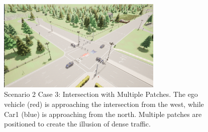 \begin{figure}[H]
    \centering
    \includegraphics[width=0.7\textwidth]{figures/experiments/scenario2_v3.png}
    \caption{Scenario 2 Case 3: Intersection with Multiple Patches. The ego vehicle (red) is approaching the intersection from the west, while Car1 (blue) is approaching from the north. Multiple patches are positioned to create the illusion of dense traffic.}
    \label{fig:scenario_intersection_case3}
\end{figure}
